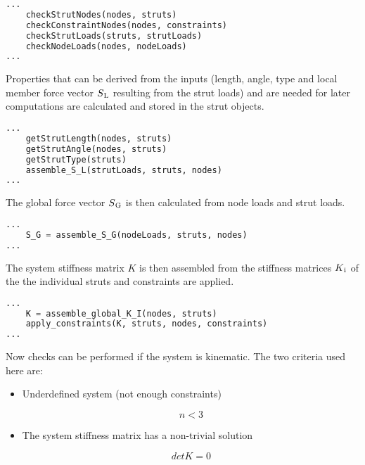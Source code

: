 \begin{lstlisting}[basicstyle=\small,language=python]
...
    checkStrutNodes(nodes, struts)
    checkConstraintNodes(nodes, constraints)
    checkStrutLoads(struts, strutLoads)
    checkNodeLoads(nodes, nodeLoads)
...
\end{lstlisting}

Properties that can be derived from the inputs (length, angle, type and local member force vector $S\textsubscript{L}$ resulting from the strut loads) and are needed for later computations are calculated and stored in the strut objects.

\begin{lstlisting}[basicstyle=\small,language=python]
...
    getStrutLength(nodes, struts)
    getStrutAngle(nodes, struts)
    getStrutType(struts)
    assemble_S_L(strutLoads, struts, nodes)
...
\end{lstlisting}

The global force vector $S\textsubscript{G}$ is then calculated from node loads and strut loads.

\begin{lstlisting}[basicstyle=\small,language=python]
...
    S_G = assemble_S_G(nodeLoads, struts, nodes)
...
\end{lstlisting}

The system stiffness matrix $K$ is then assembled from the stiffness matrices $K\textsubscript{i}$ of the the individual struts and constraints are applied.

\begin{lstlisting}[basicstyle=\small,language=python]
...
    K = assemble_global_K_I(nodes, struts)
    apply_constraints(K, struts, nodes, constraints)
...
\end{lstlisting}

Now checks can be performed if the system is kinematic. The two criteria used here are:
\begin{itemize}

  \item Underdefined system (not enough constraints)

\begin{equation}
n < 3
\end{equation}

  \item The system stiffness matrix has a non-trivial solution

\begin{equation}
det K = 0
\end{equation}

\end{itemize}

